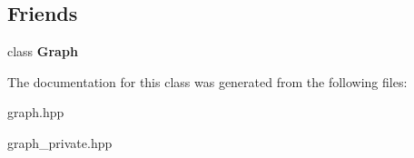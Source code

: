 \subsection*{Friends}
\begin{DoxyCompactItemize}
\item 
\mbox{\label{class_graph_1_1_iterator_afab89afd724f1b07b1aaad6bdc61c47a}} 
class {\bfseries Graph}
\end{DoxyCompactItemize}


The documentation for this class was generated from the following files\+:\begin{DoxyCompactItemize}
\item 
graph.\+hpp\item 
graph\+\_\+private.\+hpp\end{DoxyCompactItemize}
